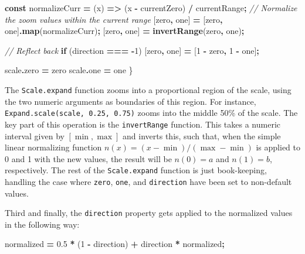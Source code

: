 \documentclass[
  openany]{book}
\newenvironment{Shaded}{\begin{snugshade}}{\end{snugshade}}
\newcommand{\AttributeTok}[1]{\textcolor[rgb]{0.13,0.29,0.53}{#1}}
\newcommand{\CommentTok}[1]{\textcolor[rgb]{0.56,0.35,0.01}{\textit{#1}}}
\newcommand{\ControlFlowTok}[1]{\textcolor[rgb]{0.13,0.29,0.53}{\textbf{#1}}}
\newcommand{\DecValTok}[1]{\textcolor[rgb]{0.00,0.00,0.81}{#1}}
\newcommand{\FloatTok}[1]{\textcolor[rgb]{0.00,0.00,0.81}{#1}}
\newcommand{\FunctionTok}[1]{\textcolor[rgb]{0.13,0.29,0.53}{\textbf{#1}}}
\newcommand{\KeywordTok}[1]{\textcolor[rgb]{0.13,0.29,0.53}{\textbf{#1}}}
\newcommand{\NormalTok}[1]{#1}
\newcommand{\OperatorTok}[1]{\textcolor[rgb]{0.81,0.36,0.00}{\textbf{#1}}}
\theoremstyle{definition}
\theoremstyle{definition}
\theoremstyle{definition}
\theoremstyle{definition}
\theoremstyle{remark}
\begin{document}
\begin{Shaded}
\begin{Highlighting}[]
  \KeywordTok{const}\NormalTok{ normalizeCurr }\OperatorTok{=}\NormalTok{ (x) }\KeywordTok{=\textgreater{}}\NormalTok{ (x }\OperatorTok{{-}}\NormalTok{ currentZero) }\OperatorTok{/}\NormalTok{ currentRange}\OperatorTok{;}
  \CommentTok{// Normalize the zoom values within the current range}
\NormalTok{  [zero}\OperatorTok{,}\NormalTok{ one] }\OperatorTok{=}\NormalTok{ [zero}\OperatorTok{,}\NormalTok{ one]}\OperatorTok{.}\FunctionTok{map}\NormalTok{(normalizeCurr)}\OperatorTok{;}
\NormalTok{  [zero}\OperatorTok{,}\NormalTok{ one] }\OperatorTok{=} \FunctionTok{invertRange}\NormalTok{(zero}\OperatorTok{,}\NormalTok{ one)}\OperatorTok{;}

  \CommentTok{// Reflect back}
  \ControlFlowTok{if}\NormalTok{ (direction }\OperatorTok{===} \OperatorTok{{-}}\DecValTok{1}\NormalTok{) [zero}\OperatorTok{,}\NormalTok{ one] }\OperatorTok{=}\NormalTok{ [}\DecValTok{1} \OperatorTok{{-}}\NormalTok{ zero}\OperatorTok{,} \DecValTok{1} \OperatorTok{{-}}\NormalTok{ one]}\OperatorTok{;}
    
\NormalTok{  scale}\OperatorTok{.}\AttributeTok{zero} \OperatorTok{=}\NormalTok{ zero}
\NormalTok{  scale}\OperatorTok{.}\AttributeTok{one} \OperatorTok{=}\NormalTok{ one}
\NormalTok{\}}
\end{Highlighting}
\end{Shaded}

The \texttt{Scale.expand} function zooms into a proportional region of the scale, using the two numeric arguments as boundaries of this region. For instance, \texttt{Expand.scale(scale,\ 0.25,\ 0.75)} zooms into the middle 50\% of the scale. The key part of this operation is the \texttt{invertRange} function. This takes a numeric interval given by \([\min, \max]\) and inverts this, such that, when the simple linear normalizing function \(n(x) = (x - \min) / (\max - \min)\) is applied to 0 and 1 with the new values, the result will be \(n(0) = a\) and \(n(1) = b\), respectively. The rest of the \texttt{Scale.expand} function is just book-keeping, handling the case where \texttt{zero}, \texttt{one}, and \texttt{direction} have been set to non-default values.

Third and finally, the \texttt{direction} property gets applied to the normalized values in the following way:

\begin{Shaded}
\begin{Highlighting}[]
\NormalTok{normalized }\OperatorTok{=} \FloatTok{0.5} \OperatorTok{*}\NormalTok{ (}\DecValTok{1} \OperatorTok{{-}}\NormalTok{ direction) }\OperatorTok{+}\NormalTok{ direction }\OperatorTok{*}\NormalTok{ normalized}\OperatorTok{;}
\end{Highlighting}
\end{Shaded}
\end{document}
